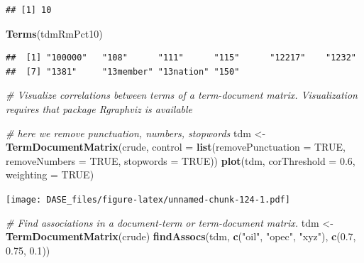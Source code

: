 \documentclass[]{book}
\newenvironment{Shaded}{\begin{snugshade}}{\end{snugshade}}
\newcommand{\KeywordTok}[1]{\textcolor[rgb]{0.13,0.29,0.53}{\textbf{{#1}}}}
\newcommand{\DataTypeTok}[1]{\textcolor[rgb]{0.13,0.29,0.53}{{#1}}}
\newcommand{\FloatTok}[1]{\textcolor[rgb]{0.00,0.00,0.81}{{#1}}}
\newcommand{\StringTok}[1]{\textcolor[rgb]{0.31,0.60,0.02}{{#1}}}
\newcommand{\CommentTok}[1]{\textcolor[rgb]{0.56,0.35,0.01}{\textit{{#1}}}}
\newcommand{\OtherTok}[1]{\textcolor[rgb]{0.56,0.35,0.01}{{#1}}}
\newcommand{\NormalTok}[1]{{#1}}
\begin{document}
\begin{verbatim}
## [1] 10
\end{verbatim}

\begin{Shaded}
\begin{Highlighting}[]
\KeywordTok{Terms}\NormalTok{(tdmRmPct10)}
\end{Highlighting}
\end{Shaded}

\begin{verbatim}
##  [1] "100000"   "108"      "111"      "115"      "12217"    "1232"    
##  [7] "1381"     "13member" "13nation" "150"
\end{verbatim}

\begin{Shaded}
\begin{Highlighting}[]
\CommentTok{# Visualize correlations between terms of a term-document matrix. Visualization requires that package Rgraphviz is available}

\CommentTok{# here we remove punctuation, numbers, stopwords}
\NormalTok{tdm <-}\StringTok{ }\KeywordTok{TermDocumentMatrix}\NormalTok{(crude,}
                          \DataTypeTok{control =} \KeywordTok{list}\NormalTok{(}\DataTypeTok{removePunctuation =} \OtherTok{TRUE}\NormalTok{,}
                                         \DataTypeTok{removeNumbers =} \OtherTok{TRUE}\NormalTok{,}
                                         \DataTypeTok{stopwords =} \OtherTok{TRUE}\NormalTok{))}
\KeywordTok{plot}\NormalTok{(tdm, }\DataTypeTok{corThreshold =} \FloatTok{0.6}\NormalTok{, }\DataTypeTok{weighting =} \OtherTok{TRUE}\NormalTok{)}
\end{Highlighting}
\end{Shaded}

\texttt{[image: DASE\_files/figure-latex/unnamed-chunk-124-1.pdf]}

\begin{Shaded}
\begin{Highlighting}[]
\CommentTok{# Find associations in a document-term or term-document matrix.}
\NormalTok{tdm <-}\StringTok{ }\KeywordTok{TermDocumentMatrix}\NormalTok{(crude)}
\KeywordTok{findAssocs}\NormalTok{(tdm, }\KeywordTok{c}\NormalTok{(}\StringTok{"oil"}\NormalTok{, }\StringTok{"opec"}\NormalTok{, }\StringTok{"xyz"}\NormalTok{), }\KeywordTok{c}\NormalTok{(}\FloatTok{0.7}\NormalTok{, }\FloatTok{0.75}\NormalTok{, }\FloatTok{0.1}\NormalTok{))}
\end{Highlighting}
\end{Shaded}
\end{document}
